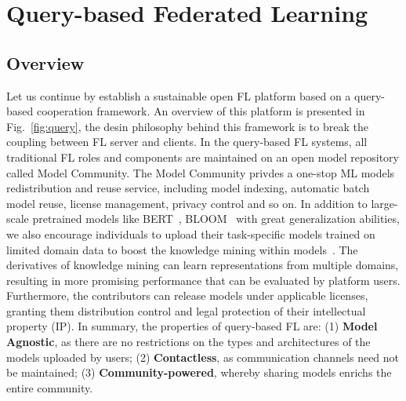 \section{Query-based Federated Learning}
\label{sec:query}
\subsection{Overview}
\label{sec:query_overview}
Let us continue by establish a sustainable open FL platform based on a query-based cooperation framework.
An overview of this platform is presented in Fig.~\ref{fig:query}, the desin philosophy behind this framework is to break the coupling between FL server and clients.
In the query-based FL systems, all traditional FL roles and components are maintained on an open model repository called Model Community. The Model Community privdes a one-stop ML models redistribution and reuse service, including model indexing, automatic batch model reuse, license management, privacy control and so on.
In addition to large-scale pretrained models like BERT~\cite{devlin2018bert}, BLOOM~\cite{scao2022bloom} with great generalization abilities, we also encourage individuals to upload their task-specific models trained on limited domain data to boost the knowledge mining within models~\cite{you2021workshop}.
The derivatives of knowledge mining can learn representations from multiple domains, resulting in more promising performance that can be evaluated by platform users.
Furthermore, the contributors can release models under applicable licenses, granting them distribution control and legal protection of their intellectual property (IP).
In summary, the properties of query-based FL are:
(1) \textbf{Model Agnostic}, as there are no restrictions on the types and architectures of the models uploaded by users;
(2) \textbf{Contactless}, as communication channels need not be maintained; 
(3) \textbf{Community-powered}, whereby sharing models enrichs the entire community.

